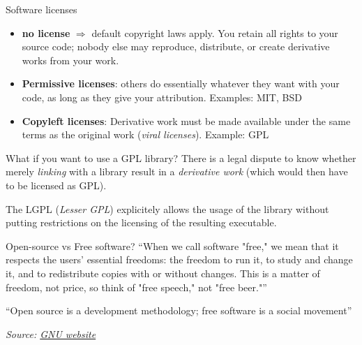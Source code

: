 \documentclass[compress]{beamer}
\newcommand{\source}[2]{{\tiny\it Source: \href{#1}{#2}}}
\begin{document}
\begin{frame}[label=licenses]{Software licenses}
    \begin{itemize}
        \item<+-> {\bf no license} $\Rightarrow$ default copyright laws apply.
            You retain all rights to your source code; nobody else may
            reproduce, distribute, or create derivative works from your work.
        \item<+-> {\bf Permissive licenses}: others do essentially whatever they
            want with your code, as long as they give your attribution.
            Examples: MIT, BSD
        \item<+-> {\bf Copyleft licenses}: Derivative work must be made
            available under the same terms as the original work (\emph{viral
            licenses}). Example: GPL
    \end{itemize}


    \centering



\end{frame}

\begin{frame}{What if you want to use a GPL library?}
    There is a legal dispute to know whether merely \emph{linking} with a
    library result in a \emph{derivative work} (which would then have to be
    licensed as GPL).

    \pause

    The LGPL (\emph{Lesser GPL}) explicitely allows the usage of the library
    without putting restrictions on the licensing of the resulting executable.

\end{frame}

\begin{frame}{}

    \begin{exampleblock}{Open-source vs Free software?}
    ``When we call software "free," we mean that it respects the users' essential
    freedoms: the freedom to run it, to study and change it, and to redistribute
    copies with or without changes. This is a matter of freedom, not price, so
    think of "free speech," not "free beer."''

        \vspace{1em}
    ``Open source is a development methodology; free software is a social
        movement''

    \end{exampleblock}

    \source{https://www.gnu.org/philosophy/open-source-misses-the-point.en.html}{GNU
    website}
\end{frame}
\end{document}

